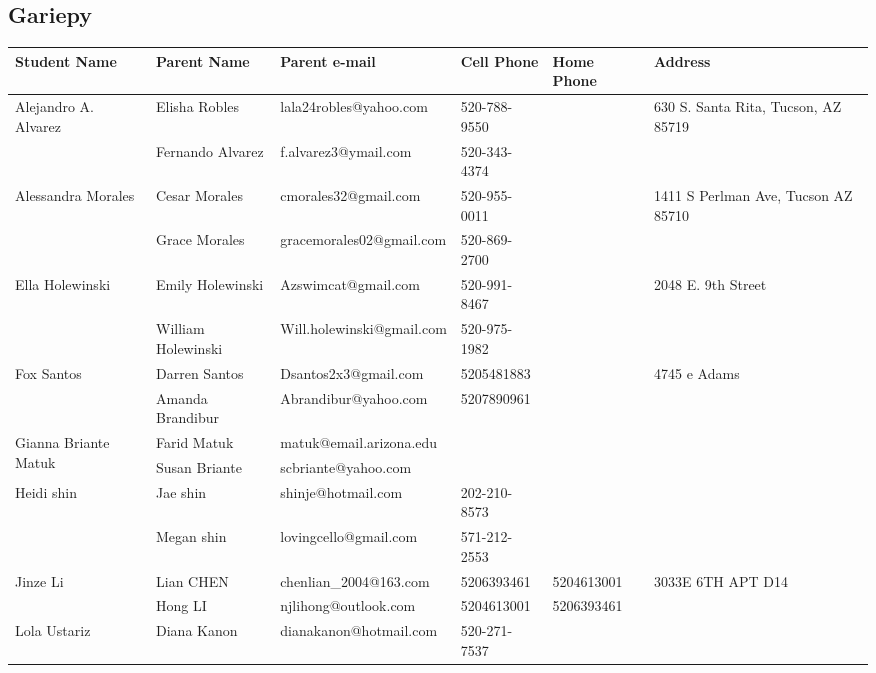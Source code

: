 \documentclass[landscape]{article}\usepackage[]{graphicx}\usepackage[]{color}
\begin{document}
\subsection{Gariepy}
\begin{longtable}{|p{100pt}|p{100pt}|p{140pt}|p{60pt}|p{64pt}|p{120pt}|}
\textbf{Student Name} & \textbf{Parent Name} & \textbf{Parent e-mail} & \textbf{Cell Phone} & \textbf{Home Phone} & \textbf{Address}\\
\hline
\hline
\multirow{2}{100pt}{Alejandro A. Alvarez} & Elisha Robles & lala24robles@yahoo.com & 520-788-9550 &  & \multirow{2}{120pt}{630 S. Santa Rita, Tucson, AZ 85719} \\
 & Fernando Alvarez & f.alvarez3@ymail.com & 520-343-4374 &  & \\
\hline
\multirow{2}{100pt}{Alessandra Morales } & Cesar Morales  & cmorales32@gmail.com & 520-955-0011 &  & \multirow{2}{120pt}{1411 S Perlman Ave, Tucson AZ 85710} \\
 & Grace Morales & gracemorales02@gmail.com & 520-869-2700 &  & \\
\hline
\multirow{2}{100pt}{Ella Holewinski} & Emily Holewinski & Azswimcat@gmail.com & 520-991-8467 &  & \multirow{2}{120pt}{2048 E. 9th Street} \\
 & William Holewinski & Will.holewinski@gmail.com & 520-975-1982 &  & \\
\hline
\multirow{2}{100pt}{Fox Santos} & Darren Santos & Dsantos2x3@gmail.com & 5205481883 &  & \multirow{2}{120pt}{4745 e Adams} \\
 & Amanda Brandibur & Abrandibur@yahoo.com & 5207890961 &  & \\
\hline
\multirow{2}{100pt}{Gianna Briante Matuk} & Farid Matuk & matuk@email.arizona.edu &  &  & \multirow{2}{120pt}{} \\
 & Susan Briante & scbriante@yahoo.com &  &  & \\
\hline
\multirow{2}{100pt}{Heidi shin} & Jae shin & shinje@hotmail.com & 202-210-8573 &  & \multirow{2}{120pt}{} \\
 & Megan shin & lovingcello@gmail.com & 571-212-2553 &  & \\
\hline
\multirow{2}{100pt}{Jinze Li} & Lian CHEN & chenlian\_2004@163.com & 5206393461 & 5204613001 & \multirow{2}{120pt}{3033E 6TH APT D14} \\
 & Hong LI & njlihong@outlook.com & 5204613001 & 5206393461 & \\
\hline
\multirow{2}{100pt}{Lola Ustariz} & Diana Kanon & dianakanon@hotmail.com & 520-271-7537 &  & \multirow{2}{120pt}{} \\

\end{longtable}
\end{document}
